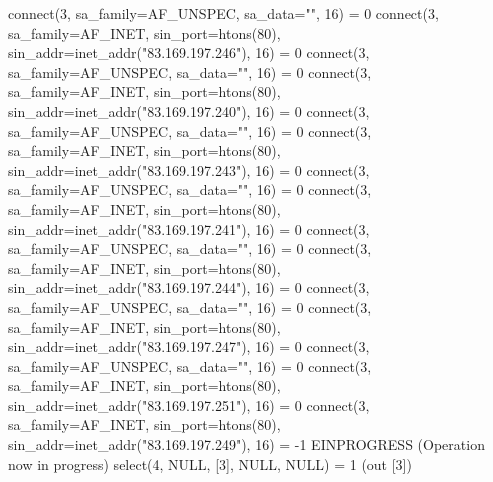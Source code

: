 \documentclass[a4paper,11pt]{article}
\begin{document}
\begin{bashcode}
connect(3, {sa_family=AF_UNSPEC, sa_data="\0\0\0\0\0\0\0\0\0\0\0\0\0\0"}, 16) = 0
connect(3, {sa_family=AF_INET, sin_port=htons(80), sin_addr=inet_addr("83.169.197.246")}, 16) = 0
connect(3, {sa_family=AF_UNSPEC, sa_data="\0\0\0\0\0\0\0\0\0\0\0\0\0\0"}, 16) = 0
connect(3, {sa_family=AF_INET, sin_port=htons(80), sin_addr=inet_addr("83.169.197.240")}, 16) = 0
connect(3, {sa_family=AF_UNSPEC, sa_data="\0\0\0\0\0\0\0\0\0\0\0\0\0\0"}, 16) = 0
connect(3, {sa_family=AF_INET, sin_port=htons(80), sin_addr=inet_addr("83.169.197.243")}, 16) = 0
connect(3, {sa_family=AF_UNSPEC, sa_data="\0\0\0\0\0\0\0\0\0\0\0\0\0\0"}, 16) = 0
connect(3, {sa_family=AF_INET, sin_port=htons(80), sin_addr=inet_addr("83.169.197.241")}, 16) = 0
connect(3, {sa_family=AF_UNSPEC, sa_data="\0\0\0\0\0\0\0\0\0\0\0\0\0\0"}, 16) = 0
connect(3, {sa_family=AF_INET, sin_port=htons(80), sin_addr=inet_addr("83.169.197.244")}, 16) = 0
connect(3, {sa_family=AF_UNSPEC, sa_data="\0\0\0\0\0\0\0\0\0\0\0\0\0\0"}, 16) = 0
connect(3, {sa_family=AF_INET, sin_port=htons(80), sin_addr=inet_addr("83.169.197.247")}, 16) = 0
connect(3, {sa_family=AF_UNSPEC, sa_data="\0\0\0\0\0\0\0\0\0\0\0\0\0\0"}, 16) = 0
connect(3, {sa_family=AF_INET, sin_port=htons(80), sin_addr=inet_addr("83.169.197.251")}, 16) = 0
connect(3, {sa_family=AF_INET, sin_port=htons(80), sin_addr=inet_addr("83.169.197.249")}, 16) = -1 EINPROGRESS (Operation now in progress)
select(4, NULL, [3], NULL, NULL)        = 1 (out [3])
\end{bashcode}
\end{document}
